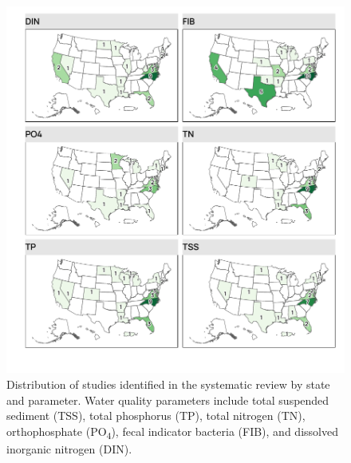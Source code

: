 \documentclass[utf8]{FrontiersinHarvard}
\begin{document}
\begin{figure}[p]
\includegraphics[width=1\linewidth,]{../figures/study_map} \caption{Distribution of studies identified in the systematic review by state and parameter. Water quality parameters include total suspended sediment (TSS), total phosphorus (TP), total nitrogen (TN), orthophosphate (PO\textsubscript{4}), fecal indicator bacteria (FIB), and dissolved inorganic nitrogen (DIN).}\label{fig:studymap}
\end{figure}
\end{document}
